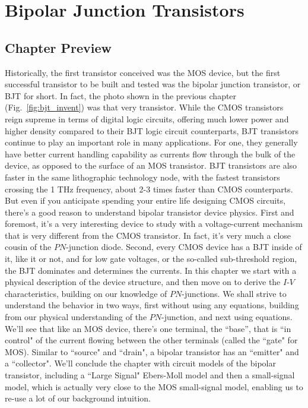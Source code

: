 \chapter{Bipolar Junction Transistors}
\label{ch:ch11_bjt}
\graphicspath{{./figs_bjt/}}
\section{Chapter Preview}
Historically, the first transistor conceived was the MOS device, but the first successful transistor to be built and tested was the bipolar junction transistor, or BJT for short.  In fact, the photo shown in the previous chapter (Fig.~\ref{fig:bjt_invent}) was that very transistor.  While the CMOS transistors reign supreme in terms of digital logic circuits, offering much lower power and higher density compared to their BJT logic circuit counterparts, BJT transistors continue to play an important role in many applications.  For one, they generally have better current handling capability as currents flow through the bulk of the device, as opposed to the surface of an MOS transistor.  BJT transistors are also faster in the same lithographic technology node, with the fastest transistors crossing the 1 THz frequency, about 2-3 times faster than CMOS counterparts.  But even if you anticipate spending your entire life designing CMOS circuits, there's a good reason to understand bipolar transistor device physics.  First and foremost, it's a very interesting device to study with a voltage-current mechanism that is very different from the CMOS transistor.  In fact, it's very much a close cousin of the $PN$-junction diode.  Second, every CMOS device has a BJT inside of it, like it or not, and for low gate voltages, or the so-called sub-threshold region, the BJT dominates and determines the currents.  
In this chapter we start with a physical description of the device structure, and then move on to derive the $I$-$V$ characteristics, building on our knowledge of $PN$-junctions. We shall strive to understand the behavior in two ways, first without using any equations, building from our physical understanding of the $PN$-junction, and next using equations.  We'll see that like an MOS device, there's one terminal, the ``base'', that is ``in control" of the current flowing between the other terminals (called the ``gate" for MOS).  Similar to ``source" and ``drain", a bipolar transistor has an ``emitter" and a ``collector".   We'll conclude the chapter with circuit models of the bipolar transistor, including a ``Large Signal" Ebers-Moll model and then a small-signal model, which is actually very close to the MOS small-signal model, enabling us to re-use a lot of our background intuition.
